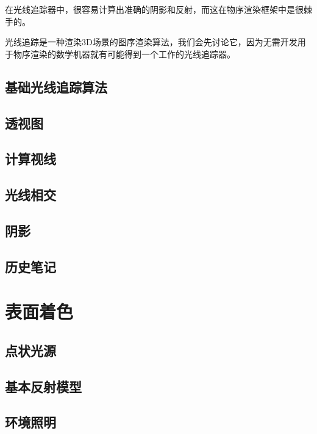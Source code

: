 \documentclass[lang=cn,12pt]{elegantbook}
\begin{document}
\begin{note}
在光线追踪器中，很容易计算出准确的阴影和反射，而这在物序渲染框架中是很棘手的。 
\end{note}

光线追踪是一种渲染3D场景的图序渲染算法，我们会先讨论它，因为无需开发用于物序渲染的数学机器就有可能得到一个工作的光线追踪器。

\section{基础光线追踪算法}



\section{透视图}

\section{计算视线}

\section{光线相交}

\section{阴影}

\section{历史笔记}

\chapter{表面着色}

\section{点状光源}


\section{基本反射模型}


\section{环境照明}
\end{document}
